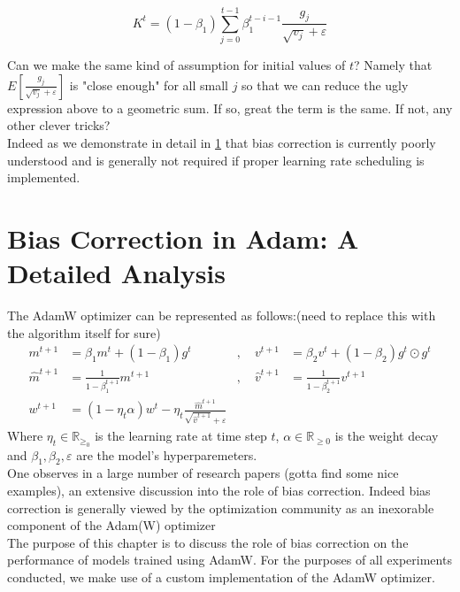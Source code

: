 \documentclass[12pt]{book}
\newcommand{\R}{\mathbb{R}}
\begin{document}
\[
	K^{t} = (1-\beta_1)\sum_{j=0}^{t-1} {\beta_1^{t-i-1} \frac{g_j}{\sqrt{v_j} + \varepsilon }}
\]

Can we make the same kind of assumption for initial values of $t$? Namely that $E[\frac{g_j}{\sqrt{v_j} + \varepsilon }]$ is "close enough" for all small $j$ so that we can reduce the ugly expression above to a geometric sum. If so, great the term is the same. If not, any other clever tricks? 
\\
Indeed as we demonstrate in detail in \ref{chap: bias correction} that bias correction is currently poorly understood and is generally not required if proper learning rate scheduling is implemented. 

\chapter{Bias Correction in Adam: A Detailed Analysis}
\label{chap: bias correction}
The AdamW optimizer can be represented as follows:(need to replace this with the algorithm itself for sure)
\begin{equation*}
\begin{aligned}
	m^{t+1} &= \beta_1 m^{t} + (1-\beta_1)g^{t}  &, \quad  v^{t+1} &= \beta_2 v^{t} + (1-\beta_2) g^{t} \odot g^{t}\\
	\hat{m}^{t+1} &= \frac{1}{1-\beta_1^{t+1}} m^{t+1}  &, \quad \hat{v}^{t+1} &= \frac{1}{1-\beta_2^{t+1}} v^{t+1}\\
	w^{t+1} &= (1-\eta_t\alpha)w^{t} - \eta_t \frac{\hat{m}^{t+1}}{\sqrt{\hat{v}^{t+1}} +\varepsilon }
\end{aligned}
\end{equation*}
Where $\eta_t\in\R_{\ge_0}$ is the learning rate at time step $t$, $\alpha\in \R_{\ge0}$ is the weight decay and $\beta_1, \beta_2, \varepsilon $ are the model's hyperparemeters. 
\\
One observes in a large number of research papers (gotta find some nice examples), an extensive discussion into the role of bias correction. 
Indeed bias correction is generally viewed by the optimization community as an inexorable component of the Adam(W) optimizer\\
The purpose of this chapter is to discuss the role of bias correction on the performance of models trained using AdamW. For the purposes of all experiments conducted, we make use of a custom implementation of the AdamW optimizer. 
\end{document}
